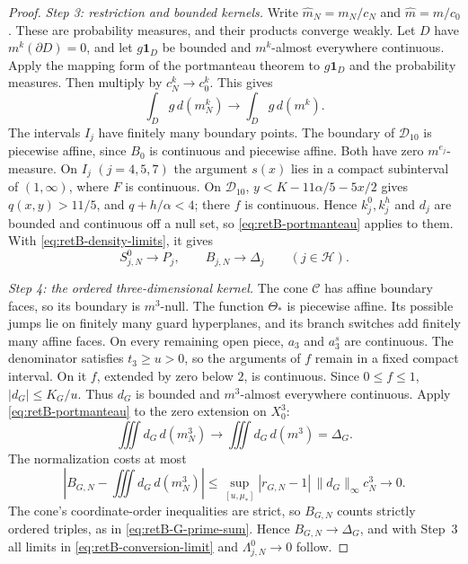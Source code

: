 \begin{proof}
\emph{Step 3: restriction and bounded kernels.}
Write $\widehat m_N=m_N/c_N$ and $\widehat m=m/c_0$.
These are probability measures, and their products converge weakly.
Let $D$ have $m^k(\partial D)=0$, and let $g\mathbf1_D$ be bounded and
$m^k$-almost everywhere continuous. Apply the mapping form of the portmanteau
theorem \cite[Theorems~2.1 and~2.7]{Billingsley1999} to
$g\mathbf1_D$ and the probability measures. Then multiply by
$c_N^k\to c_0^k$. This gives
\begin{equation}\label{eq:retB-portmanteau}
 \int_Dg\,d(m_N^k)\longrightarrow\int_Dg\,d(m^k).
\end{equation}
The intervals $I_j$ have finitely many boundary points.
The boundary of $\mathcal D_{10}$ is piecewise affine, since $B_0$ is
continuous and piecewise affine. Both have zero $m^{e_j}$-measure.
On $I_j$ $(j=4,5,7)$ the argument $s(x)$ lies in a compact subinterval of
$(1,\infty)$, where $F$ is continuous. On $\mathcal D_{10}$,
$y<K-11\alpha/5-5x/2$ gives $q(x,y)>11/5$, and $q+h/\alpha<4$; there $f$ is
continuous. Hence $k_j^0,k_j^h$ and $d_j$ are bounded and continuous off a
null set, so \eqref{eq:retB-portmanteau} applies to them.
With \eqref{eq:retB-density-limits}, it gives
\begin{equation}\label{eq:retB-direct-convergence}
 S_{j,N}^0\longrightarrow P_j,\qquad
 B_{j,N}\longrightarrow\Delta_j\qquad(j\in\mathcal H).
\end{equation}

\emph{Step 4: the ordered three-dimensional kernel.}
The cone $\mathcal C$ has affine boundary faces, so its boundary is
$m^3$-null.
The function $\Theta_*$ is piecewise affine.
Its possible jumps lie on finitely many guard hyperplanes, and its branch
switches add finitely many affine faces.
On every remaining open piece, $a_3$ and $a_3^s$ are continuous.
The denominator satisfies $t_3\ge u>0$, so the arguments of $f$ remain in a
fixed compact interval. On it $f$, extended by zero below $2$, is
continuous. Since $0\le f\le1$, $|d_G|\le K_G/u$.
Thus $d_G$ is bounded and $m^3$-almost everywhere continuous.
Apply \eqref{eq:retB-portmanteau} to the zero extension on $X_0^3$:
\begin{equation}\label{eq:retB-G-portmanteau}
 \iiint d_G\,d(m_N^3)\longrightarrow
 \iiint d_G\,d(m^3)=\Delta_G.
\end{equation}
The normalization costs at most
\begin{equation}\label{eq:retB-G-normalization-error}
 \left|B_{G,N}-\iiint d_G\,d(m_N^3)\right|
 \le\sup_{[u,\mu_*]}|r_{G,N}-1|\,\|d_G\|_\infty c_N^3
 \longrightarrow0.
\end{equation}
The cone's coordinate-order inequalities are strict, so $B_{G,N}$ counts
strictly ordered triples, as in \eqref{eq:retB-G-prime-sum}.
Hence $B_{G,N}\to\Delta_G$, and with Step~3 all limits in
\eqref{eq:retB-conversion-limit} and $\Lambda^0_{j,N}\to0$ follow.
\end{proof}

